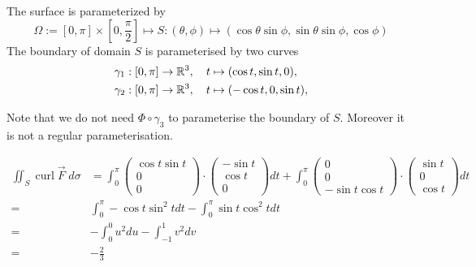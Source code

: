 \documentclass[11pt]{article}
\begin{document}
\begin{solution}     
The surface is parameterized by $$\Omega := [0,\pi]\times[0,\frac{\pi}{2}] \mapsto S: (\theta, \phi) \mapsto (\cos\theta\sin\phi, \sin\theta\sin\phi, \cos\phi)$$
The boundary of domain $S$ is parameterised by two curves
\begin{align*}
        &\gamma_1 : \left[0,\pi\right] \to \mathbb{R}^3, \quad t \mapsto (\cos t, \sin t, 0),\\
        &\gamma_2 : \left[
0,\pi\right] \to \mathbb{R}^3, \quad t \mapsto (-\cos t, 0, \sin t),\\
\end{align*}

Note that we do not need $\Phi\circ\gamma_3$ to parameterise the boundary of $S$. Moreover it is not a regular parameterisation.

 \begin{align*}
         \iint_{S} \operatorname{curl} \vec F \;d\sigma &=  \int_0^{\pi} \begin{pmatrix} \cos t \sin t\\ 0 \\ 0\end{pmatrix}\cdot \begin{pmatrix} -\sin t\\ \cos t \\ 0\end{pmatrix}dt +  \int_0^{\pi} \begin{pmatrix} 0\\ 0 \\ -\sin t \cos t\end{pmatrix}\cdot \begin{pmatrix} \sin t\\ 0 \\ \cos t\end{pmatrix}dt\\ 
=& \int_0^{\pi} -\cos t \sin^2 t dt - \int_0^{\pi} \sin t \cos^2 t dt\\
=& -\int_0^0 u^2 du - \int_{-1}^1 v^2 dv\\
=& -\frac{2}{3}
\end{align*}
\end{solution}
\end{document}
